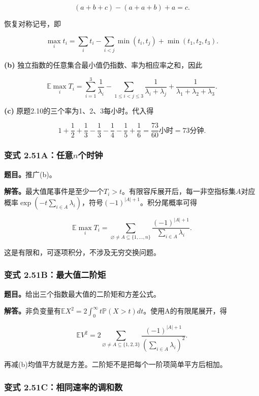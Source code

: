 \documentclass[12pt,a4paper,UTF8,fontset=fandol]{ctexart}
\begin{document}
\[
(a+b+c)-(a+a+b)+a=c.
\]

恢复对称记号，即

\[\boxed{\max_i t_i=\sum_i t_i-\sum_{i<j}\min(t_i,t_j)+\min(t_1,t_2,t_3).}\]

\textbf{(b)} 独立指数的任意集合最小值仍指数、率为相应率之和，因此

\[\boxed{\mathbb E\max_iT_i=
\sum_{i=1}^3\frac1{\lambda_i}
-\sum_{1\le i<j\le3}\frac1{\lambda_i+\lambda_j}
+\frac1{\lambda_1+\lambda_2+\lambda_3}.}\]

\textbf{(c)} 原题2.10的三个率为1、2、3每小时。代入得

\[1+\frac12+\frac13-\frac13-\frac14-\frac15+\frac16
=\boxed{\frac{73}{60}\text{小时}=73\text{分钟}.}\]

\subsubsection{\texorpdfstring{变式
2.51A：任意\(n\)个时钟}{变式 2.51A：任意n个时钟}}\label{ux53d8ux5f0f-2.51aux4efbux610fnux4e2aux65f6ux949f}

\textbf{题目。}推广(b)。

\textbf{解答。}最大值尾事件是至少一个\(T_i>t\)。有限容斥展开后，每一非空指标集\(A\)对应概率\(\exp(-t\sum_{i\in A}\lambda_i)\)，符号\((-1)^{|A|+1}\)。积分尾概率可得

\[\mathbb E\max_iT_i=\sum_{\varnothing\ne A\subseteq\{1,\ldots,n\}}
\frac{(-1)^{|A|+1}}{\sum_{i\in A}\lambda_i}.\]

这是有限和，可逐项积分，不涉及无穷交换问题。

\subsubsection{变式
2.51B：最大值二阶矩}\label{ux53d8ux5f0f-2.51bux6700ux5927ux503cux4e8cux9636ux77e9}

\textbf{题目。}给出三个指数最大值的二阶矩和方差公式。

\textbf{解答。}非负变量有\(\mathbb EX^2=2\int_0^\infty t\mathbb P(X>t)dt\)。使用A的有限尾展开，得

\[\mathbb E V^2=2\sum_{\varnothing\ne A\subseteq\{1,2,3\}}\frac{(-1)^{|A|+1}}{(\sum_{i\in A}\lambda_i)^2}.\]

再减(b)均值平方就是方差。二阶矩不是把每个一阶项简单平方后相加。

\subsubsection{变式
2.51C：相同速率的调和数}\label{ux53d8ux5f0f-2.51cux76f8ux540cux901fux7387ux7684ux8c03ux548cux6570}
\end{document}
